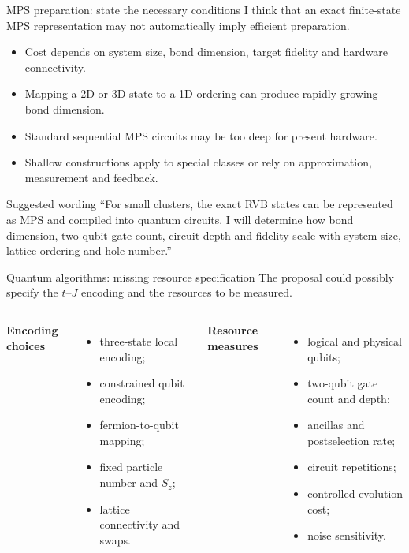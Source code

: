\documentclass[aspectratio=169,11pt]{beamer}
\begin{document}
\begin{frame}{MPS preparation: state the necessary conditions}
I think that an  exact finite-state MPS representation may  not automatically imply efficient preparation.

\begin{itemize}
  \item Cost depends on system size, bond dimension, target fidelity and hardware connectivity.
  \item Mapping a 2D or 3D state to a 1D ordering can produce rapidly growing bond dimension.
  \item Standard sequential MPS circuits may be too deep for present hardware.
  \item Shallow constructions apply to special classes or rely on approximation, measurement and feedback.
\end{itemize}

\begin{block}{Suggested wording}
``For small clusters, the exact RVB states can be represented as MPS and compiled into quantum circuits. I will determine how bond dimension, two-qubit gate count, circuit depth and fidelity scale with system size, lattice ordering and hole number.''
\end{block}
\end{frame}

\begin{frame}{Quantum algorithms: missing resource specification}
The proposal could possibly specify the $t$--$J$ encoding and the resources to be measured.

\begin{columns}[T]
\textbf{Encoding choices}
\begin{itemize}
  \item three-state local encoding;
  \item constrained qubit encoding;
  \item fermion-to-qubit mapping;
  \item fixed particle number and $S_z$;
  \item lattice connectivity and swaps.
\end{itemize}
\textbf{Resource measures}
\begin{itemize}
  \item logical and physical qubits;
  \item two-qubit gate count and depth;
  \item ancillas and postselection rate;
  \item circuit repetitions;
  \item controlled-evolution cost;
  \item noise sensitivity.
\end{itemize}
\end{columns}
\end{frame}
\end{document}
